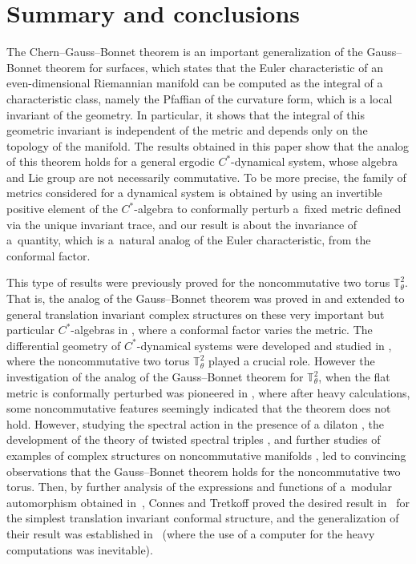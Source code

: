 \documentclass[pdftex]{sigma}
\numberwithin{equation}{section}
\begin{document}
\section{Summary and conclusions}
\label{Sec:Conclusions}

The Chern--Gauss--Bonnet theorem is an important generalization
of the Gauss--Bonnet theorem for surfaces, which states that
the Euler characteristic of an even-dimensional Riemannian
manifold can be computed as the integral of a characteristic
class, namely the Pfaf\/f\/ian of the curvature form, which is
a local invariant of the geometry. In particular, it shows that
the integral of this geometric invariant is independent of the
metric and depends only on the topology of the manifold.
The results obtained in this paper show that the analog
of this theorem holds for a general ergodic $C^*$-dynamical
system, whose algebra and Lie group are not necessarily
commutative. To be more precise, the family of metrics considered
for a dynamical system is obtained by using an invertible positive
element of the $C^*$-algebra to conformally perturb
a~f\/ixed metric def\/ined via the unique invariant trace, and our
result is about the
invariance of a~quantity, which is a~natural analog of the
Euler characteristic, from the conformal factor.

This type of results were previously proved for the
noncommutative two torus $\mathbb{T}_\theta^2$. That is, the analog of the
Gauss--Bonnet theorem was proved in \cite{GaussBonnet-ConnesTretkoff} and extended
to general translation invariant complex structures on these very
important but particular $C^*$-algebras in \cite{GaussBonnet-FK},
where a conformal factor varies the metric. The
dif\/ferential geometry of $C^*$-dynamical systems were
developed and studied in \cite{CAlgGeoDiff}, where the noncommutative
two torus $\mathbb{T}_\theta^2$ played a crucial role. However the investigation
of the analog of the Gauss--Bonnet theorem for $\mathbb{T}_\theta^2$, when the f\/lat metric is
conformally perturbed was pioneered in \cite{PreprintCC},
where after heavy calculations, some noncommutative
features seemingly indicated that the theorem does
not hold. However, stu\-dying the spectral
action in the presence of a dilaton \cite{SpActScaleChC}, the development of
the theory of twisted spectral triples \cite{TrSpTypeIII}, and further studies of
examples of complex structures on noncommutative manifolds \cite{LandietalComplex},
led to convincing observations that the Gauss--Bonnet theorem
holds for the noncommutative two torus. Then, by further analysis
of the expressions and functions of a~modular automorphism
obtained in~\cite{PreprintCC}, Connes and Tretkof\/f proved the desired
result in~\cite{GaussBonnet-ConnesTretkoff} for the simplest translation invariant conformal
structure, and the generalization of their result was established
in~\cite{GaussBonnet-FK} (where the use of a computer for the heavy computations
was inevitable).
\end{document}
